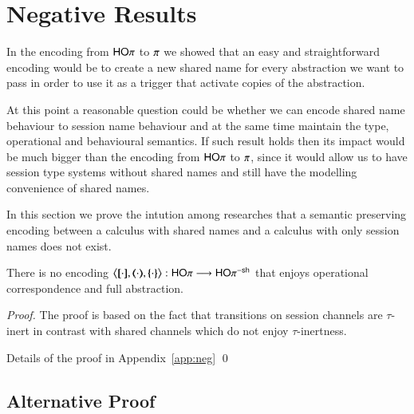 \section{Negative Results}

In the encoding from $\mathsf{HO}\pi$ to $\pi$ we showed that
an easy and straightforward encoding would be to create
a new shared name for every abstraction we want to pass
in order to use it as a trigger that activate copies of
the abstraction.

At this point a reasonable question could be whether we can
encode shared name behaviour to session name behaviour and at
the same time maintain the type, operational and behavioural semantics.
If such result holds then its impact would be much bigger than
the encoding from $\mathsf{HO}\pi$ to $\pi$, since it would
allow us to have session type systems without shared names
and still have the modelling convenience of shared names.

In this section we prove the intution among researches 
that a semantic preserving encoding between a calculus
with shared names and a calculus with only session names
does not exist.

\begin{theorem}\rm
	There is no encoding $\enco{\map{\cdot}, \mapt{\cdot}, \mapa{\cdot}}: \HOp \longrightarrow \HOp^{\minussh}$
	that enjoys operational correspondence and full abstraction.
\end{theorem}

\begin{proof}
	The proof is based on the fact that
	transitions on session channels are
	$\tau$-inert in contrast with shared
	channels which do not enjoy
	$\tau$-inertness.

	Details of the proof in Appendix~\ref{app:neg}
	\qed
\end{proof}

\subsection{Alternative Proof}



%
%

